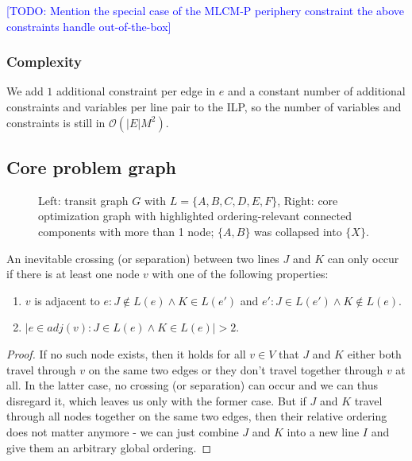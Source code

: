 \documentclass{llncs}
\newcommand\todo[1]{\textcolor{blue}{[TODO: #1]}}
\begin{document}
\todo{Mention the special case of the MLCM-P periphery constraint the above constraints handle out-of-the-box}

\subsubsection{Complexity}
We add $1$ additional constraint per edge in $e$ and a constant number of additional constraints and variables per line pair to the ILP, so the number of variables and constraints is still in $\mathcal{O}(|E|M^2)$.

%
\subsection{Core problem graph}\label{SEC:coreprobgraph}
%
\begin{figure}[t]
\centering
	
	\hspace{0.6cm}
	
	\caption{Left: transit graph $G$ with $L = \{A, B, C, D, E, F\}$, Right: core optimization graph with highlighted ordering-relevant connected components with more than 1 node; $\{A, B\}$ was collapsed into $\{X\}$.}
\end{figure}

An inevitable crossing (or separation) between two lines $J$ and $K$ can only occur if there is at least one node $v$ with one of the following properties:
\begin{enumerate}
\item $v$ is adjacent to $e : J \not\in L(e) \land K \in L(e')$ and $e' : J \in L(e') \land K \not\in L(e)$. \label{EQ:liaisonnode}
\item $|{e \in adj(v) : J \in L(e) \land K \in L(e)}| > 2$. \label{EQ:tnode}
\end{enumerate}
\begin{proof} If no such node exists, then it holds for all $v \in V$ that $J$ and $K$ either both travel through $v$ on the same two edges or they don't travel together through $v$ at all. In the latter case, no crossing (or separation) can occur and we can thus disregard it, which leaves us only with the former case. But if $J$ and $K$ travel through all nodes together on the same two edges, then their relative ordering does not matter anymore - we can just combine $J$ and $K$ into a new line $I$ and give them an arbitrary global ordering.
\end{proof}
\end{document}
